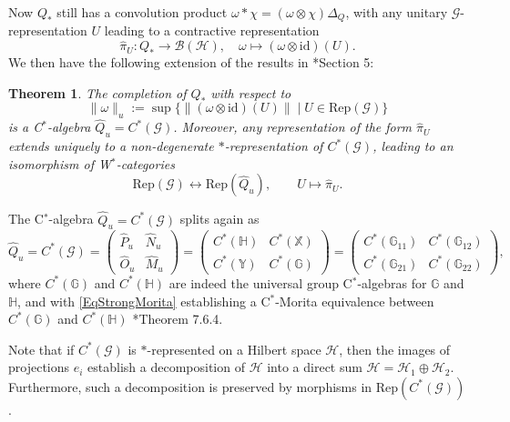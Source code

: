 \documentclass[reqno]{amsart}
\numberwithin{equation}{section}
\newtheorem{Theorem}{Theorem}[section]
\newcommand{\mcB}{\mathcal{B}}
\newcommand{\id}{\mathrm{id}}
\newcommand{\Hsp}{\mathcal{H}}
\newcommand{\G}{\mathbb{G}}
\newcommand{\Hh}{\mathbb{H}}
\newcommand{\X}{\mathbb{X}}
\newcommand{\Y}{\mathbb{Y}}
\newcommand{\msG}{\mathscr{G}}
\newcommand{\Rep}{\mathrm{Rep}}
\newcommand{\mc}{\mathcal}
\begin{document}
Now $Q_*$ still has a convolution product $\omega *\chi = (\omega \otimes \chi)\Delta_Q$, with any unitary $\msG$-representation $U$ leading to a contractive representation 
\[
\hat{\pi}_U\colon Q_*\rightarrow \mcB(\Hsp),\quad \omega \mapsto (\omega\otimes \id)(U). 
\]
We then have the following extension of the results in \cite{Kus01}*{Section 5}: 
\begin{Theorem}
The completion of $Q_*$ with respect to
\[
\|\omega\|_u := \sup\{\|(\omega\otimes \id)(U)\|\mid U \in \Rep(\msG)\}
\]
is a C$^*$-algebra $\hat{Q}_u = C^*(\msG)$. Moreover, any representation of the form $\hat{\pi}_U$ extends uniquely to a non-degenerate $*$-representation of $C^*(\msG)$,  leading to an isomorphism of W$^*$-categories 
\begin{equation}\label{EqIsoCat}
\Rep(\msG) \leftrightarrow \Rep(\hat{Q}_u),\qquad U \mapsto  \hat{\pi}_U.
\end{equation}
\end{Theorem} 
The C$^*$-algebra $\hat{Q}_u = C^*(\msG)$ splits again as 
\begin{equation}\label{EqStrongMorita}
\hat{Q}_u = C^*(\msG) = \begin{pmatrix} \hat{P}_u & \hat{N}_u \\
\hat{O}_u & \hat{M}_u\end{pmatrix} = \begin{pmatrix} C^*(\Hh) & C^*(\X) \\ C^*(\Y) & C^*(\G)\end{pmatrix} =  \begin{pmatrix} C^*(\G_{11}) & C^*(\G_{12}) \\ C^*(\G_{21}) & C^*(\G_{22})\end{pmatrix},
\end{equation}
where $C^*(\G)$ and $C^*(\Hh)$ are indeed the universal group C$^*$-algebras for $\G$ and $\Hh$, and with \eqref{EqStrongMorita} establishing a  C$^*$-Morita equivalence between $C^*(\G)$ and $C^*(\Hh)$ \cite{DC09}*{Theorem 7.6.4}. 

Note that if $C^*(\msG)$ is $*$-represented on a Hilbert space $\mc{H}$, then the images of projections $e_i$ establish a decomposition of $\mc{H}$ into a direct sum $\mc{H}=\mc{H}_1\oplus \mc{H}_2$. Furthermore, such a decomposition is preserved by morphisms in $\Rep(C^*(\msG))$.
\end{document}
